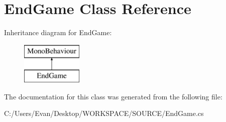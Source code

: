 \hypertarget{class_end_game}{}\section{End\+Game Class Reference}
\label{class_end_game}
Inheritance diagram for End\+Game\+:\begin{figure}[H]
\begin{center}
\leavevmode
\includegraphics[height=2.000000cm]{class_end_game}
\end{center}
\end{figure}


The documentation for this class was generated from the following file\+:\begin{DoxyCompactItemize}
\item 
C\+:/\+Users/\+Evan/\+Desktop/\+W\+O\+R\+K\+S\+P\+A\+C\+E/\+S\+O\+U\+R\+C\+E/End\+Game.\+cs\end{DoxyCompactItemize}
